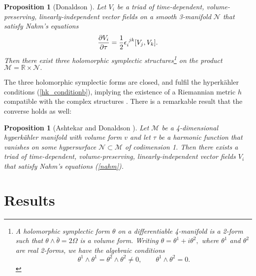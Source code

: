 \documentclass[a4paper,12pt, onecolumn, notitlepage]{article}
\newtheorem{prop}[thm]{Proposition}
\theoremstyle{definition}
\theoremstyle{remark}
\newcommand{\e}{\epsilon}
\newcommand{\ddt}[1]{\frac{\partial #1}{\partial \tau}}
\newcommand{\HK}{hyperk\"ahler }
\newcommand{\R}{\mathbb{R}}
\begin{document}
\begin{prop}[Donaldson \cite{donaldson}]
	Let $V_{i}$ be a triad of time-dependent, volume-preserving, linearly-independent vector fields on a smooth 3-manifold $\mathcal{N}$ that satisfy Nahm's equations
	$$\ddt{V_{i}} = \frac{1}{2}\e\indices{_i^j^k}[V_{j},V_{k}].
	$$
	Then there exist three holomorphic symplectic structures\footnote{A holomorphic symplectic form $\theta$ on a differentiable 4-manifold is a 2-form such that $\theta\wedge\bar{\theta}=2\Omega$ is a volume form. Writing $\theta = \theta^{1} + i\theta^{2},$ where $\theta^{1}$ and $\theta^{2}$ are real 2-forms, we have the algebraic conditions
		\begin{equation*}
		\theta^{1}\wedge\theta^{1}=\theta^{2}\wedge\theta^{2}\neq 0,\qquad \theta^{1}\wedge \theta^{2}=0.
		\end{equation*}}
	 on the product $\mathcal{M}=\R\times\mathcal{N}.$ 
\end{prop}
The three holomorphic symplectic forms are closed, and fulfil the \HK conditions (\ref{hk_conditionb}), implying the existence of a Riemannian metric $h$ compatible with the complex structures \cite{donaldson}. There is a remarkable result that the converse holds as well:\\

\begin{prop}[Ashtekar \cite{ashtekar_1988} and Donaldson \cite{donaldson}]
	Let $\mathcal{M}$ be a 4-dimensional \HK manifold with volume form $v$ and let $\tau$ be a harmonic function that vanishes on some hypersurface $\mathcal{N}\subset\mathcal{M}$ of codimension 1. Then there exists a triad of time-dependent, volume-preserving, linearly-independent vector fields $V_{i}$ that satisfy Nahm's equations (\ref{nahm}).
\end{prop}

\section{Results}
\end{document}
